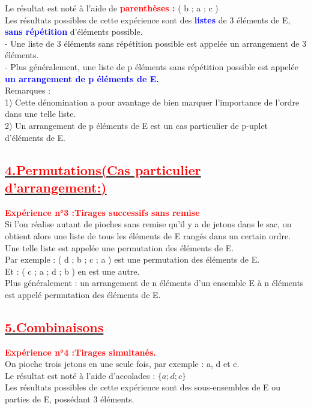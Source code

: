 \documentclass[12pt]{article}
\begin{document}
Le résultat est noté à l’aide de \textbf{\textcolor{red}{parenthèses :}} ( b ; a ; c )\\
Les résultats possibles de cette expérience sont des \textbf{\textcolor{blue}{listes}} de 3 éléments de E,
\textbf{\textcolor{blue}{sans répétition}} d’éléments possible.\\

- Une liste de 3 éléments sans répétition possible est appelée un arrangement de 3 éléments.\\
- Plus généralement, une liste de p éléments sans répétition possible est appelée\\ \textbf{\textcolor{blue}{un arrangement de p éléments de E.}}\\
Remarques :\\
1) Cette dénomination a pour avantage de bien marquer l’importance de l’ordre dans une telle liste.\\

2) Un arrangement de p éléments de E est un cas particulier de p-uplet d’éléments de E.\\
\subsection*{\underline{\textbf{\textcolor{red}{4.Permutations(Cas particulier d’arrangement:)}}}}
\textbf{\textcolor{red}{Expérience n°3 :Tirages successifs sans remise}}\\
Si l’on réalise autant de pioches sans remise qu’il y a de jetons dans le sac, on obtient alors une liste de tous les éléments de E rangés dans un certain ordre. \\
Une telle liste est appelée une permutation des éléments de E.\\

Par exemple : ( d ; b ; c ; a ) est une permutation des éléments de E.\\
Et : ( c ; a ; d ; b ) en est une autre.\\
Plus généralement : un arrangement de n éléments d’un ensemble E à n éléments est appelé permutation des éléments de E.\\
\subsection*{\underline{\textbf{\textcolor{red}{5.Combinaisons}}}}
\textbf{\textcolor{red}{Expérience n°4 :Tirages simultanés.}}\\
On pioche trois jetons en une seule fois, par exemple : a, d et c.\\
Le résultat est noté à l’aide d’accolades : $\lbrace a ; d ; c \rbrace$\\
Les résultats possibles de cette expérience sont des sous-ensembles de E ou parties de E, possédant 3 éléments.\\
\end{document}
